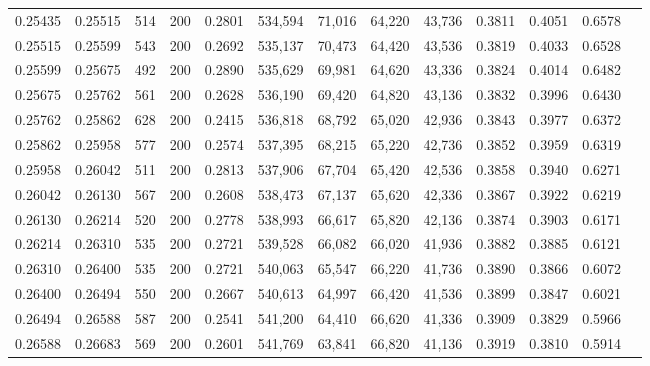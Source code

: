 \begin{tabular}{rrrrrrrrrrrrr}
0.25435 & 0.25515 &    514 & 200 &                                     0.2801 & 534,594 &  71,016 &  64,220 &  43,736 & 0.3811 & 0.4051 & 0.6578 \\
0.25515 & 0.25599 &    543 & 200 &                                     0.2692 & 535,137 &  70,473 &  64,420 &  43,536 & 0.3819 & 0.4033 & 0.6528 \\
0.25599 & 0.25675 &    492 & 200 &                                     0.2890 & 535,629 &  69,981 &  64,620 &  43,336 & 0.3824 & 0.4014 & 0.6482 \\
0.25675 & 0.25762 &    561 & 200 &                                     0.2628 & 536,190 &  69,420 &  64,820 &  43,136 & 0.3832 & 0.3996 & 0.6430 \\
0.25762 & 0.25862 &    628 & 200 &                                     0.2415 & 536,818 &  68,792 &  65,020 &  42,936 & 0.3843 & 0.3977 & 0.6372 \\
0.25862 & 0.25958 &    577 & 200 &                                     0.2574 & 537,395 &  68,215 &  65,220 &  42,736 & 0.3852 & 0.3959 & 0.6319 \\
0.25958 & 0.26042 &    511 & 200 &                                     0.2813 & 537,906 &  67,704 &  65,420 &  42,536 & 0.3858 & 0.3940 & 0.6271 \\
0.26042 & 0.26130 &    567 & 200 &                                     0.2608 & 538,473 &  67,137 &  65,620 &  42,336 & 0.3867 & 0.3922 & 0.6219 \\
0.26130 & 0.26214 &    520 & 200 &                                     0.2778 & 538,993 &  66,617 &  65,820 &  42,136 & 0.3874 & 0.3903 & 0.6171 \\
0.26214 & 0.26310 &    535 & 200 &                                     0.2721 & 539,528 &  66,082 &  66,020 &  41,936 & 0.3882 & 0.3885 & 0.6121 \\
0.26310 & 0.26400 &    535 & 200 &                                     0.2721 & 540,063 &  65,547 &  66,220 &  41,736 & 0.3890 & 0.3866 & 0.6072 \\
0.26400 & 0.26494 &    550 & 200 &                                     0.2667 & 540,613 &  64,997 &  66,420 &  41,536 & 0.3899 & 0.3847 & 0.6021 \\
0.26494 & 0.26588 &    587 & 200 &                                     0.2541 & 541,200 &  64,410 &  66,620 &  41,336 & 0.3909 & 0.3829 & 0.5966 \\
0.26588 & 0.26683 &    569 & 200 &                                     0.2601 & 541,769 &  63,841 &  66,820 &  41,136 & 0.3919 & 0.3810 & 0.5914 \\

\end{tabular}
